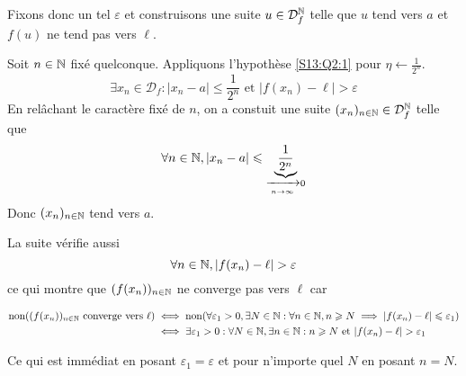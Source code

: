 \documentclass{article}
\renewenvironment{question_kholle}[2][ ]
{
	\subsection{\texorpdfstring{#2}{}}
	\notblank{#1}
	{
		\noindent #1
		\bigbreak
	}
	{}
	\begin{proof}
}
{
	\end{proof}
}
\begin{document}
\begin{question_kholle}
\begin{itemize}[label=$\star$]
  Fixons donc un tel $\varepsilon$ et construisons une suite $u \in \mathcal{D}_{f}^{\mathbb N}$ telle que $u$ tend vers $a$ et $f(u)$ ne tend pas vers $\ell$.

  Soit $n \in \mathbb N$ fixé quelconque. Appliquons l'hypothèse \eqref{S13:Q2:1} pour $\eta \leftarrow \frac{1}{2^{n}}$.
  $$
  \exists x_{n} \in \mathcal{D}_{f} : \lvert x_{n} - a \rvert  \leqslant \frac{1}{2^{n}} \text{ et } \lvert f(x_{n}) - \ell \rvert  > \varepsilon
  $$
  En relâchant le caractère fixé de $n$, on a constuit une suite $(x_{n})_{n \in \mathbb N} \in \mathcal{D}_{f}^{\mathbb N}$ telle que
  $$
  \forall n \in \mathbb N, \lvert x_{n} - a \rvert \leqslant \underbrace{ \frac{1}{2^{n}} }_{ \xrightarrow[n \to \infty]{} 0}
  $$
  Donc $(x_{n})_{n \in \mathbb N}$ tend vers $a$.

  La suite vérifie aussi
  $$
  \forall n \in \mathbb N, \lvert f(x_{n}) - \ell \rvert > \varepsilon
  $$
  ce qui montre que $(f(x_{n}))_{n \in \mathbb N}$ ne converge pas vers $\ell$ car 
  
  \begin{align*}
  \text{non}((f(x_{n}))_{n \in \mathbb N} \text{ converge vers } \ell) &\iff \mathrm{non}(\forall \varepsilon_{1}>0, \exists N \in \mathbb N : \forall n \in \mathbb N, n \geqslant N \implies \lvert f(x_{n}) - \ell \rvert \leqslant \varepsilon_{1}) \\
  &\iff \exists \varepsilon_{1}>0: \forall N \in \mathbb N, \exists n  \in \mathbb N : n\geqslant N \text{ et } \lvert f(x_{n}) - \ell \rvert  > \varepsilon_{1}
  \end{align*}
  
  Ce qui est immédiat en posant $\varepsilon_{1} = \varepsilon$ et pour n'importe quel $N$ en posant $n = N$.
  \end{itemize}
\end{question_kholle}
\end{document}
